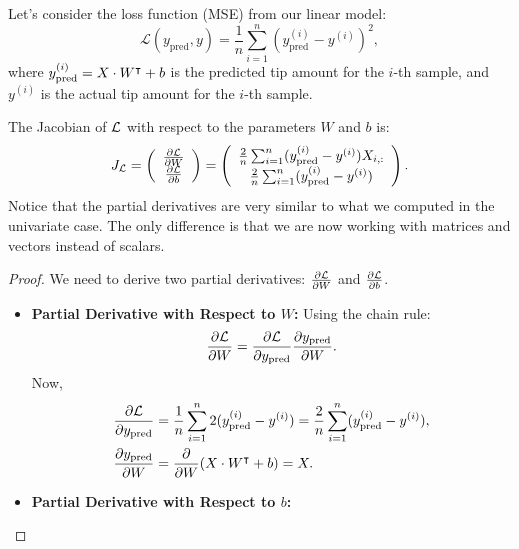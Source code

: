 \begin{example}
Let's consider the loss function (MSE) from our linear model:
$$\mathcal{L}(y_{\text{pred}},y) = \frac{1}{n}\sum_{i=1}^n (y_{\text{pred}}^{(i)}-y^{(i)})^2,$$
where $y_{\text{pred}}^{(i)} = X\cdot W^\intercal + b$ is the predicted tip amount for the $i$-th sample, and $y^{(i)}$ is the actual tip amount for the $i$-th sample. 

The Jacobian of $\mathcal{L}$ with respect to the parameters $W$ and $b$ is:
$$J_{\mathcal{L}} = \left(\begin{array}{c}
    \frac{\partial \mathcal{L}}{\partial W} \\ \frac{\partial \mathcal{L}}{\partial b} 
\end{array}\right)= 
\left(\begin{array}{c}
    \frac{2}{n}\sum_{i=1}^n (y_{\text{pred}}^{(i)}-y^{(i)})X_{i,:} \\
    \frac{2}{n}\sum_{i=1}^n (y_{\text{pred}}^{(i)}-y^{(i)})
\end{array}\right).$$
Notice that the partial derivatives are very similar to what we computed in the univariate case. The only difference is that we are now working with matrices and vectors instead of scalars.
\begin{proof}
We need to derive two partial derivatives: $\frac{\partial \mathcal{L}}{\partial W}$ and $\frac{\partial \mathcal{L}}{\partial b}$.
\begin{itemize}
\item \textbf{Partial Derivative with Respect to $W$:}
Using the chain rule:
$$\frac{\partial \mathcal{L}}{\partial W} = \frac{\partial \mathcal{L}}{\partial y_{\text{pred}}}\frac{\partial y_{\text{pred}}}{\partial W}.$$
Now, 
\begin{align*}
    \frac{\partial \mathcal{L}}{\partial y_{\text{pred}}} &= \frac{1}{n}\sum_{i=1}^n 2(y_{\text{pred}}^{(i)}-y^{(i)}) = \frac{2}{n}\sum_{i=1}^n (y_{\text{pred}}^{(i)}-y^{(i)}), \\
    \frac{\partial y_{\text{pred}}}{\partial W} &= \frac{\partial}{\partial W}(X\cdot W^\intercal + b) = X.
\end{align*}
\item \textbf{Partial Derivative with Respect to $b$:}
\end{itemize}
\end{proof}
\end{example}


